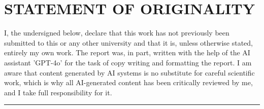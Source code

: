 \documentclass[../report.tex]{subfiles}
\begin{document}
    \section*{STATEMENT OF ORIGINALITY}


    \noindent I, the undersigned below, declare that this work has not previously been submitted to this or any other university and that it is, unless otherwise stated, entirely my own work. The report was, in part, written with the help of the AI assistant 'GPT-4o' for the task of copy writing and formatting the report. I am aware that content generated by AI systems is no substitute for careful scientific work, which is why all AI-generated content has been critically reviewed by me, and I take full responsibility for it.

    \vspace{1cm}

    \hrule width 0.45\linewidth
    \hfill \hspace{0.025\linewidth}
    \hrulefill

\end{document}
